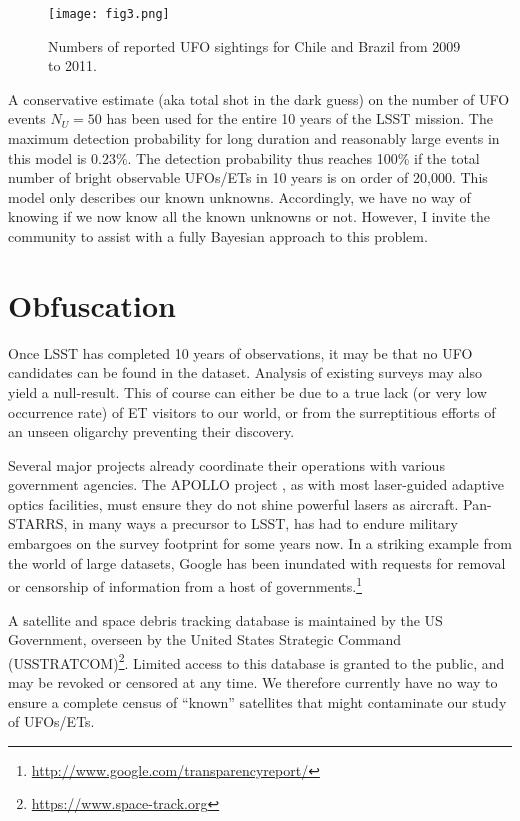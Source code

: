 \documentclass[iop]{emulateapj}
\begin{document}
\begin{figure}[]
\centering
\texttt{[image: fig3.png]}
\caption{Numbers of reported UFO sightings for Chile and Brazil from 2009 to 2011.}
\label{years}
\end{figure}


A conservative estimate (aka total shot in the dark guess) on the number of UFO events $N_U=50$ has been used for the entire 10 years of the LSST mission. The maximum detection probability for long duration and reasonably large events in this model is $0.23\%$. The detection probability thus reaches 100\% if the total number of bright observable UFOs/ETs in 10 years is on order of 20,000. This model only describes our known unknowns. Accordingly, we have no way of knowing if we now know all the known unknowns or not. However, I invite the community to assist with a fully Bayesian approach to this problem.


\section{Obfuscation}

Once LSST has completed 10 years of observations, it may be that no UFO candidates can be found in the dataset. Analysis of existing surveys may also yield a null-result. This of course can either be due to a true lack (or very low occurrence rate) of ET visitors to our world, or from the surreptitious efforts of an unseen oligarchy preventing their discovery. 

Several major projects already coordinate their operations with various government agencies. The APOLLO project \citep{apollo}, as with most laser-guided adaptive optics facilities, must ensure they do not shine powerful lasers as aircraft. Pan-STARRS, in many ways a precursor to LSST, has had to endure military embargoes on the survey footprint for some years now. In a striking example from the world of large datasets, Google has been inundated with requests for removal or censorship of information from a host of governments.\footnote{\url{http://www.google.com/transparencyreport/}}

A satellite and space debris tracking database is maintained by the US Government, overseen by the United States Strategic Command (USSTRATCOM)\footnote{\url{https://www.space-track.org}}. Limited access to this database is granted to the public, and may be revoked or censored at any time. We therefore currently have no way to ensure a complete census of ``known'' satellites that might contaminate our study of UFOs/ETs.
\end{document}
